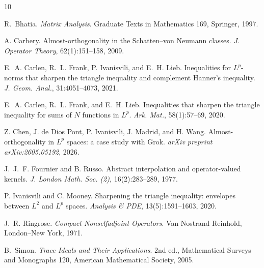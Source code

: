 \documentclass[11pt]{article}
\theoremstyle{definition}
\newcommand{\1}{\mathbf{1}}
\begin{document}

\begin{thebibliography}{10}

R.~Bhatia.
\newblock \emph{Matrix Analysis}.
\newblock Graduate Texts in Mathematics 169, Springer, 1997.

A. Carbery.
\newblock Almost-orthogonality in the Schatten--von Neumann classes.
\newblock \emph{J. Operator Theory}, 62(1):151--158, 2009.

E.~A. Carlen, R.~L. Frank, P. Ivanisvili, and E.~H. Lieb.
\newblock Inequalities for $L^p$-norms that sharpen the triangle inequality and complement Hanner's inequality.
\newblock \emph{J. Geom. Anal.}, 31:4051--4073, 2021.

E.~A. Carlen, R.~L. Frank, and E.~H. Lieb.
\newblock Inequalities that sharpen the triangle inequality for sums of $N$ functions in $L^p$.
\newblock \emph{Ark. Mat.}, 58(1):57--69, 2020.


Z. Chen, J. de Dios Pont, P. Ivanisvili, J. Madrid, and H. Wang.
\newblock Almost-orthogonality in $L^p$ spaces: a case study with Grok.
\newblock \emph{arXiv preprint arXiv:2605.05192}, 2026.


J.~J.~F. Fournier and B. Russo.
\newblock Abstract interpolation and operator-valued kernels.
\newblock \emph{J. London Math. Soc. (2)}, 16(2):283--289, 1977.

P. Ivanisvili and C. Mooney.
\newblock Sharpening the triangle inequality: envelopes between $L^2$ and $L^p$ spaces.
\newblock \emph{Analysis \& PDE}, 13(5):1591--1603, 2020.

J.~R. Ringrose.
\newblock \emph{Compact Nonselfadjoint Operators}.
\newblock Van Nostrand Reinhold, London--New York, 1971.

B.~Simon.
\newblock \emph{Trace Ideals and Their Applications}.
\newblock 2nd ed., Mathematical Surveys and Monographs 120,
American Mathematical Society, 2005.


\end{thebibliography}
\end{document}
